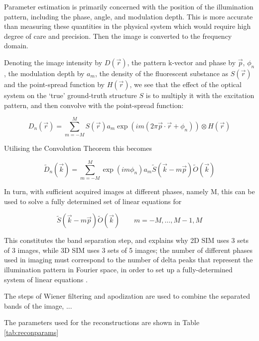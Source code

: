 \documentclass[12pt]{article}
\begin{document}
Parameter estimation is primarily concerned with the position of the illumination pattern,
including the phase, angle, and modulation depth.
This is more accurate than measuring these quantities in the physical system which would require high degree of care and precision.
Then the image is converted to the frequency domain.

Denoting the image intensity by $D(\vec{r})$, the pattern k-vector and phase by $\vec{p}$, $\phi_n$,
the modulation depth by $a_m$, the density of the fluorescent substance as $S(\vec{r})$ and the point-spread function by $H(\vec{r})$,
we see that the effect of the optical system on the `true' ground-truth structure $S$ is to multiply it with the excitation pattern,
and then convolve with the point-spread function:

\[D_n(\vec{r}) = \sum_{m=-M}^{M}{S(\vec{r})a_m\exp(im(2\pi\vec{p}\cdot\vec{r}+\phi_n))\otimes H(\vec{r})}\]

Utilising the Convolution Theorem this becomes

\[\tilde{D}_n(\vec{k}) = \sum_{m=-M}^{M}{\exp(im\phi_n)a_m\tilde{S}(\vec{k}-m\vec{p})\tilde{O}(\vec{k})}\]

In turn, with sufficient acquired images at different phases, namely M, this can be used to solve a fully determined set of linear equations for

\[\tilde{S}(\vec{k}-m\vec{p})\tilde{O}(\vec{k})\qquad m=-M,\dots,M-1,M\]

This constitutes the band separation step, and explains why 2D SIM uses 3 sets of 3 images, while 3D SIM uses 3 sets of 5 images;
the number of different phases used in imaging must correspond to the number of delta peaks that represent the illumination pattern in Fourier space,
in order to set up a fully-determined system of linear equations \cite{params}.

The steps of Wiener filtering and apodization are used to combine the separated bands of the image, ...

The parameters used for the reconstructions are shown in Table \ref{tab:reconparams}
\end{document}
